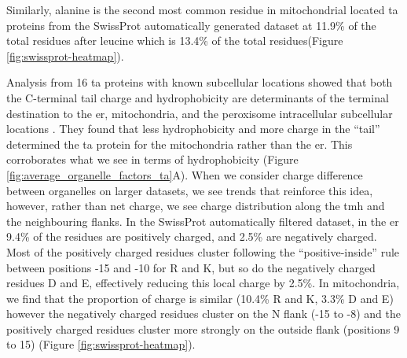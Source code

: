 Similarly, alanine is the second most common residue in mitochondrial located \gls{ta} proteins from the SwissProt automatically generated dataset at 11.9\% of the total residues after leucine which is 13.4\% of the total residues(Figure \ref{fig:swissprot-heatmap}).

Analysis from 16 \gls{ta} proteins with known subcellular locations showed that both the C\--terminal tail charge and hydrophobicity are determinants of the terminal destination to the \gls{er}, mitochondria, and the peroxisome intracellular subcellular locations \cite{Costello2017}.
They found that less hydrophobicity and more charge in the ``tail'' determined the \gls{ta} protein for the mitochondria rather than the \gls{er}.
This corroborates what we see in terms of hydrophobicity (Figure \ref{fig:average_organelle_factors_ta}A).
When we consider charge difference between organelles on larger datasets, we see trends that reinforce this idea, however, rather than net charge, we see charge distribution along the \gls{tmh} and the neighbouring flanks.
In the SwissProt automatically filtered dataset, in the \gls{er} 9.4\% of the residues are positively charged, and 2.5\% are negatively charged.
Most of the positively charged residues cluster following the ``positive\--inside'' rule between positions -15 and -10 for R and K, but so do the negatively charged residues D and E, effectively reducing this local charge by 2.5\%.
In mitochondria, we find that the proportion of charge is similar (10.4\% R and K, 3.3\% D and E) however the negatively charged residues cluster on the N flank (-15 to -8) and the positively charged residues cluster more strongly on the outside flank (positions 9 to 15) (Figure \ref{fig:swissprot-heatmap}).

